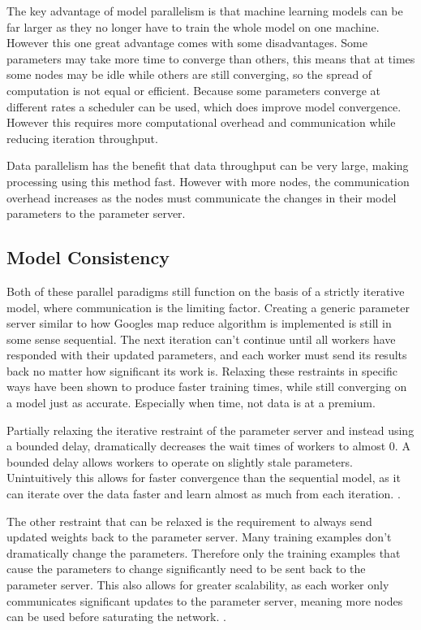 The key advantage of model parallelism is that machine learning models can be
far larger as they no longer have to train the whole model on one machine.
However this one great advantage comes with some disadvantages. Some parameters
may take more time to converge than others, this means that at times some nodes
may be idle while others are still converging, so the spread of computation is
not equal or efficient. \cite{Dean2012Distbelief} Because some parameters
converge at different rates a scheduler can be used, which does improve model
convergence. However this requires more computational overhead and communication
while reducing iteration throughput.
\cite{kim2016STRADS}

Data parallelism has the benefit that data throughput can be very large, making
processing using this method fast. However with more nodes, the
communication overhead increases as the nodes must communicate the changes in
their model parameters to the parameter server. \cite{elgabli2020gadmm}

\subsection{Model Consistency}
Both of these parallel paradigms still function on the basis of a strictly
iterative model, where communication is the limiting factor. Creating a generic
parameter server similar to how Googles map reduce algorithm is implemented
\cite{googlemapreduce2008} is still in some sense sequential. The next iteration
can't continue until all workers have responded with their updated parameters,
and each worker must send its results back no matter how significant its work
is. Relaxing these restraints in specific ways have been shown to produce faster
training times, while still converging on a model just as accurate. Especially
when time, not data is at a premium.\cite{li2014communication}
\par
Partially relaxing the iterative restraint of the parameter server and instead
using a bounded delay, dramatically decreases the wait times of workers to
almost 0. A bounded delay allows workers to operate on slightly stale
parameters. Unintuitively this allows for faster convergence than the sequential
model, as it can iterate over the data faster and learn almost as much from each
iteration. \cite{li2014communication}.
\par
The other restraint that can be relaxed is the requirement to always send
updated weights back to the parameter server. Many training examples don't
dramatically change the parameters. Therefore only the training examples that
cause the parameters to change significantly need to be sent back to the
parameter server. This also allows for greater scalability, as each worker only
communicates significant updates to the parameter server, meaning more nodes can
be used before saturating the network. \cite{li2014communication}. 

